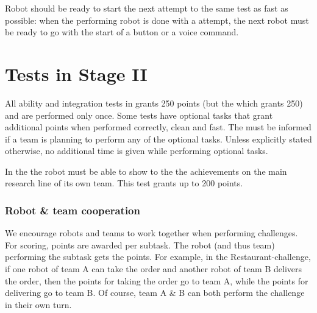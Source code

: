 \documentclass[11pt, twoside, openright, a4paper, chapterprefix]{scrbook}
\begin{document}
Robot should be ready to start the next attempt to the same test as fast as possible: 
  when the performing robot is done with a attempt, the next robot must be ready to go with the start of a button or a voice command.

\newpage


\newpage


\newpage


\newpage


\newpage


\newpage


\chapter{Tests in Stage II}
\label{chap:stage_II}

\begin{itshape}
All ability and integration tests in  grants 250 points (but the  which grants 250) and are performed only once. Some tests have optional tasks that grant additional points when performed correctly, clean and fast. The  must be informed if a team is planning to perform any of the optional tasks. Unless explicitly stated otherwise, no additional time is given while performing optional tasks.

In the  the robot must be able to show to the  the achievements on the main research line of its own team. This test grants up to 200 points.

\subsection{Robot \& team cooperation}
We encourage robots and teams to work together when performing challenges.
For scoring, points are awarded per subtask. The robot (and thus team) performing the subtask gets the points.
For example, in the Restaurant-challenge, if one robot of team A can take the order and another robot of team B delivers the order, then the points for taking the order go to team A, while the points for delivering go to team B. 
Of course, team A \& B can both perform the challenge in their own turn.

\end{itshape}

\newpage


\newpage


\newpage


\newpage




\printabx
\printidx
\end{document}
